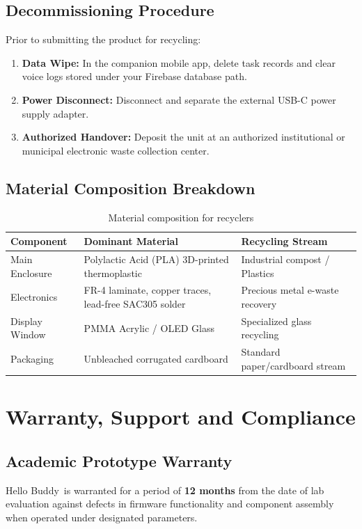 \documentclass[11pt,a4paper,oneside]{report}
\newcommand{\hdr}[1]{\cellcolor{LightBlue}\textbf{#1}}
\newcommand{\ProductName}{Hello Buddy}
\begin{document}
\section{Decommissioning Procedure}
Prior to submitting the product for recycling:
\begin{enumerate}[leftmargin=*]
\item \textbf{Data Wipe:} In the companion mobile app, delete task records and clear voice logs stored under your Firebase database path.
\item \textbf{Power Disconnect:} Disconnect and separate the external USB-C power supply adapter.
\item \textbf{Authorized Handover:} Deposit the unit at an authorized institutional or municipal electronic waste collection center.
\end{enumerate}

\section{Material Composition Breakdown}
\begin{table}[H]\centering\small
\caption{Material composition for recyclers}
\begin{tabularx}{\linewidth}{|l|X|l|}\hline
\hdr{Component} & \hdr{Dominant Material} & \hdr{Recycling Stream}\\ \hline
Main Enclosure & Polylactic Acid (PLA) 3D-printed thermoplastic & Industrial compost / Plastics \\ \hline
Electronics & FR-4 laminate, copper traces, lead-free SAC305 solder & Precious metal e-waste recovery \\ \hline
Display Window & PMMA Acrylic / OLED Glass & Specialized glass recycling \\ \hline
Packaging & Unbleached corrugated cardboard & Standard paper/cardboard stream \\ \hline
\end{tabularx}
\end{table}

\chapter{Warranty, Support and Compliance}\label{ch:compliance}

\section{Academic Prototype Warranty}
\ProductName\ is warranted for a period of \textbf{12 months} from the date of lab evaluation against defects in firmware functionality and component assembly when operated under designated parameters.
\end{document}
